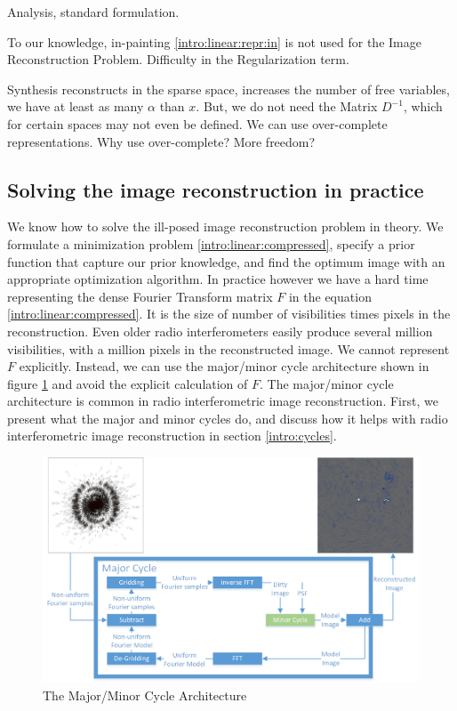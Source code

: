 Analysis, standard formulation.

To our knowledge, in-painting \eqref{intro:linear:repr:in} is not used for the Image Reconstruction Problem. Difficulty in the Regularization term. 

Synthesis reconstructs in the sparse space, increases the number of free variables, we have at least as many $\alpha$ than $x$. But, we do not need the Matrix $D^{-1}$, which for certain spaces may not even be defined. We can use over-complete representations.
Why use over-complete? More freedom?



\subsection{Solving the image reconstruction in practice}\label{intro:major}
We know how to solve the ill-posed image reconstruction problem in theory. We formulate a minimization problem \eqref{intro:linear:compressed}, specify a prior function that capture our prior knowledge, and find the optimum image with an appropriate optimization algorithm. In practice however we have a hard time representing the dense Fourier Transform matrix $F$ in the equation \eqref{intro:linear:compressed}. It is the size of number of visibilities times pixels in the reconstruction. Even older radio interferometers easily produce several million visibilities, with a million pixels in the reconstructed image. We cannot represent $F$ explicitly. Instead, we can use the major/minor cycle architecture shown in figure \ref{intro:major:fig} and avoid the explicit calculation of $F$. The major/minor cycle architecture is common in radio interferometric image reconstruction. First, we present what the major and minor cycles do, and discuss how it helps with radio interferometric image reconstruction in section \ref{intro:cycles}.

\begin{figure}[h]
	\centering
	\includegraphics[width=0.80\linewidth]{./chapters/02.hypo/Major-Minor3.png}
	\caption{The Major/Minor Cycle Architecture}
	\label{intro:major:fig}
\end{figure}

